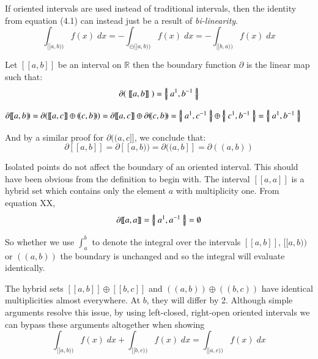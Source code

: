 If oriented intervals are used instead of traditional intervals, then the identity from equation (4.1) can instead just be a result of \emph{bi-linearity}.
\begin{equation}
	\int_{[\![a,b)\!)} f(x) \; dx = - \int_{\ominus [\![a,b)\!)} f(x) \; dx = - \int_{[\![b,a)\!)} f(x) \; dx
\end{equation}


\begin{definition}
	Let $[\![ a,b ]\!]$ be an interval on $\mathbb{R}$ then the boundary function $\partial$ is the linear map such that:
	\begin{equation}
		\partial( \;[\![a,b]\!]\; ) = \left\{ \! \left| \;  a^1, b^{-1}  \; \right| \! \right\}
	\end{equation}
\end{definition}


$\partial [\![a,b)\!) = \partial ( [\![a,c]\!] \oplus (\!(c,b)\!) ) = \partial [\![a,c]\!] \oplus \partial (\!(c,b)\!) =  \hset{ a^1, c^{-1} } \oplus \hset{ c^1, b^{-1} } = \hset{a^1, b^{-1} }$


And by a similar proof for $\partial (\!(a,c]\!]$, we conclude that:
\begin{equation}
	\partial [\![a,b]\!] = \partial [\![a,b)\!) = \partial (\!(a,b]\!] = \partial (\!(a,b)\!)
\end{equation}


Isolated points do not affect the boundary of an oriented interval.
This should have been obvious from the definition to begin with.
The interval $[\![ a,a ]\!]$ is a hybrid set which contains only the element $a$ with multiplicity one.
From equation XX,
\begin{equation}
	\partial [\![ a,a ]\!] = \left\{ \! \left| \; a^1, a^{-1} \; \right| \! \right\} = \emptyset
\end{equation}

So whether we use $\int_a^b$ to denote the integral over the intervals $[\![a,b]\!]$, $[\![a,b)\!)$ or  $(\!(a,b)\!)$ the boundary is unchanged and so the integral will evaluate identically.

The hybrid sets $[\![a,b]\!] \oplus [\![b,c]\!]$ and $(\!(a,b)\!) \oplus (\!(b,c)\!)$ have identical multiplicities almost everywhere.
At $b$, they will differ by 2. 
Although simple arguments resolve this issue, by using left-closed, right-open oriented intervals we can bypass these arguments altogether when showing
\begin{equation}
	\int_{[\![a,b)\!)} f(x) \; dx + \int_{[\![b,c)\!)} f(x) \; dx = \int_{[\![a,c)\!)} f(x) \; dx
\end{equation}

